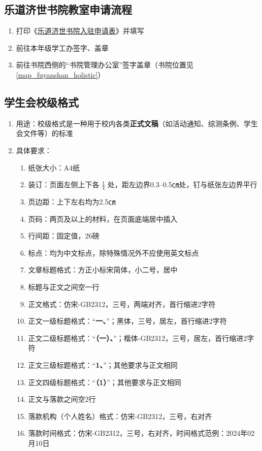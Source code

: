 \subsection[乐道济世书院教室申请流程]{乐道济世书院教室申请流程}
\begin{enumerate}
    \item 打印《\uline{\href{https://xshch.sdsmu.edu.cn/_upload/article/files/1f/59/48196a87425186f3db9eb6fbd219/cdbf8cf8-d42a-4dd3-894d-5fb5df83ee13.doc}{乐道济世书院入驻申请表}}》并填写
    \item 前往本年级学工办签字、盖章
    \item 前往书院西侧的“书院管理办公室”签字盖章（书院位置见\uline{\ref{map_fuyanshan_holistic}}）
\end{enumerate}

\subsection[学生会校级格式]{学生会校级格式}
\begin{enumerate}
    \item 用途：校级格式是一种用于校内各类\textbf{正式文稿}（如活动通知、综测条例、学生会文件等）的标准
    \item 具体要求：
          \begin{enumerate}
              \item 纸张大小：A4纸
              \item 装订：页面左侧上下各 $\frac{1}{4}$ 处，距左边界0.3--0.5㎝处，钉与纸张左边界平行
              \item 页边距：上下左右均为2.5㎝
              \item 页码：两页及以上的材料，在页面底端居中插入
              \item 行间距：固定值，26磅
              \item 标点：均为中文标点，除特殊情况\footnotemark 外不应使用英文标点
              \item 文章标题格式：方正小标宋简体，小二号，居中
              \item 标题与正文之间空一行
              \item 正文格式：仿宋-GB2312，三号，两端对齐，首行缩进2字符
              \item 正文一级标题格式：“\textbf{一、}”；黑体，三号，居左，首行缩进2字符
              \item 正文二级标题格式：“\textbf{（一）、}”；楷体-GB2312，三号，居左，首行缩进2字符
              \item 正文三级标题格式：“\textbf{1、}”；其他要求与正文相同
              \item 正文四级标题格式：“\textbf{（1）}”；其他要求与正文相同
              \item 正文与落款之间空2行
              \item 落款机构（个人姓名）格式：仿宋-GB2312，三号，右对齐
              \item 落款时间格式：仿宋-GB2312，三号，右对齐，时间格式范例：2024年02月10日
          \end{enumerate}
\end{enumerate}

